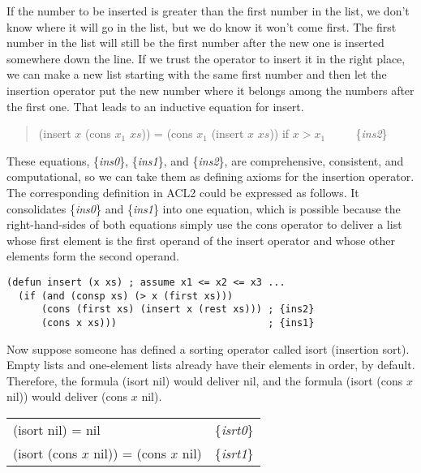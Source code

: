 If the number to be inserted is greater than the first number
in the list, we don't know where it will go in the list,
but we do know it won't come first.
The first number in the list will still be the first number
after the new one is inserted somewhere down the line.
If we trust the operator to insert it in the right place,
we can make a new list starting with the same first number
and then  let the insertion operator put the new number
where it belongs among the numbers after the first one.
That leads to an inductive equation for insert.

\begin{quote}
(insert $x$ (cons $x_1$ $xs$)) = (cons $x_1$ (insert $x$ $xs$)) if $x > x_1$ ~~~~ \{\emph{ins2}\}
\end{quote}

These equations, \{\emph{ins0}\}, \{\emph{ins1}\}, and \{\emph{ins2}\},
are comprehensive, consistent, and computational,
so we can take them as defining axioms for the insertion operator.
The corresponding definition in ACL2 could be expressed as follows.
It consolidates \{\emph{ins0}\} and \{\emph{ins1}\} into one equation,
which is possible because the right-hand-sides of both equations
simply use the cons operator to deliver a list whose first element
is the first operand of the insert operator and whose other elements
form the second operand.

\label{defun:insert-isort}
\begin{Verbatim}
(defun insert (x xs) ; assume x1 <= x2 <= x3 ...
  (if (and (consp xs) (> x (first xs)))
      (cons (first xs) (insert x (rest xs))) ; {ins2}
      (cons x xs)))                          ; {ins1}
\end{Verbatim}

Now suppose someone has defined a sorting operator called isort
(insertion sort).
Empty lists and one-element lists already have their
elements in order, by default.
Therefore, the formula (isort nil) would deliver nil,
and the formula (isort (cons $x$ nil)) would deliver
(cons $x$ nil).

\begin{center}
\label{eq:isrt0}\label{eq:isrt1}
\begin{tabular}{ll}
(isort nil) = nil                       & \{\emph{isrt0}\} \\
(isort (cons $x$ nil)) = (cons $x$ nil) & \{\emph{isrt1}\} \\
\end{tabular}
\end{center}

